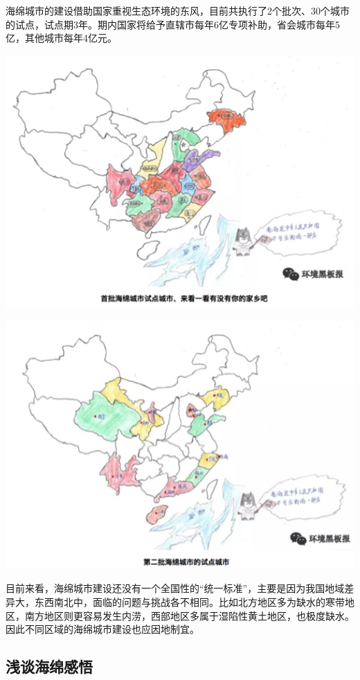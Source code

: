 \documentclass[
]{book}
\begin{document}
海绵城市的建设借助国家重视生态环境的东风，目前共执行了2个批次、30个城市的试点，试点期3年。期内国家将给予直辖市每年6亿专项补助，省会城市每年5亿，其他城市每年4亿元。

\includegraphics[width=6.67in]{images/ch5}

\includegraphics[width=6.67in]{images/ch6}

目前来看，海绵城市建设还没有一个全国性的``统一标准''，主要是因为我国地域差异大，东西南北中，面临的问题与挑战各不相同。比如北方地区多为缺水的寒带地区，南方地区则更容易发生内涝，西部地区多属于湿陷性黄土地区，也极度缺水。因此不同区域的海绵城市建设也应因地制宜。

\hypertarget{ux6d45ux8c08ux6d77ux7ef5ux611fux609f}{%
\subsection{浅谈海绵感悟}\label{ux6d45ux8c08ux6d77ux7ef5ux611fux609f}}
\end{document}
